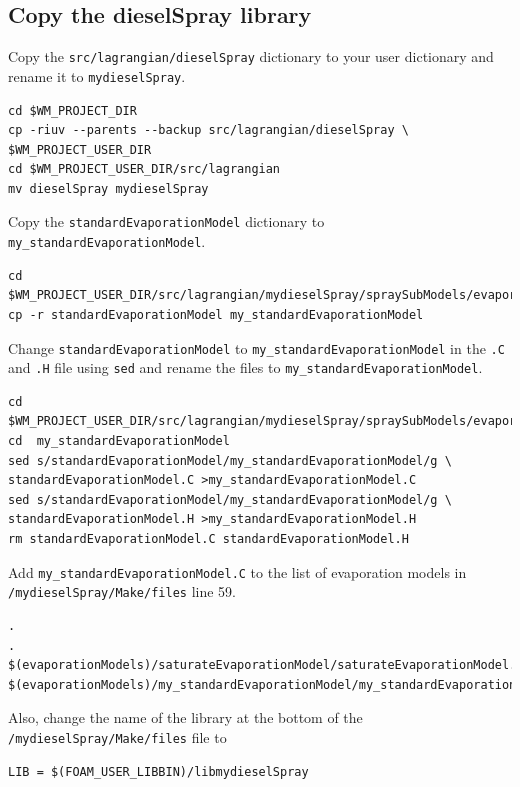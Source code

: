 \documentclass{report}
\begin{document}
\subsection{Copy the dieselSpray library}
Copy the \verb+src/lagrangian/dieselSpray+ dictionary to your user dictionary and rename it to
\newline \noindent
\verb+mydieselSpray+. 

\begin{verbatim}
cd $WM_PROJECT_DIR
cp -riuv --parents --backup src/lagrangian/dieselSpray \
$WM_PROJECT_USER_DIR
cd $WM_PROJECT_USER_DIR/src/lagrangian
mv dieselSpray mydieselSpray
\end{verbatim} 
\noindent
Copy the \verb+standardEvaporationModel+ dictionary to \verb+my_standardEvaporationModel+.

\begin{verbatim}
cd $WM_PROJECT_USER_DIR/src/lagrangian/mydieselSpray/spraySubModels/evaporationModel 
cp -r standardEvaporationModel my_standardEvaporationModel 
\end{verbatim} 
\noindent
Change \verb+standardEvaporationModel+ to \verb+my_standardEvaporationModel+ in the \verb+.C+ and \verb+.H+ file using \verb+sed+ and rename the files to \verb+my_standardEvaporationModel+. 

\begin{verbatim}
cd $WM_PROJECT_USER_DIR/src/lagrangian/mydieselSpray/spraySubModels/evaporationModel
cd  my_standardEvaporationModel
sed s/standardEvaporationModel/my_standardEvaporationModel/g \
standardEvaporationModel.C >my_standardEvaporationModel.C
sed s/standardEvaporationModel/my_standardEvaporationModel/g \
standardEvaporationModel.H >my_standardEvaporationModel.H
rm standardEvaporationModel.C standardEvaporationModel.H
\end{verbatim}
\noindent
Add \verb+my_standardEvaporationModel.C+ to the list of evaporation models in \newline \noindent
\verb+/mydieselSpray/Make/files+ line 59.
\begin{verbatim}
.
.
$(evaporationModels)/saturateEvaporationModel/saturateEvaporationModel.C
$(evaporationModels)/my_standardEvaporationModel/my_standardEvaporationModel.C
\end{verbatim}
\noindent
Also, change the name of the library at the bottom of the \verb+/mydieselSpray/Make/files+ file to
\begin{verbatim}
LIB = $(FOAM_USER_LIBBIN)/libmydieselSpray
\end{verbatim}
\end{document}
